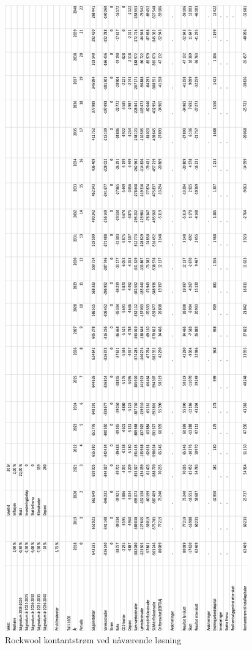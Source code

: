 \begin{figure}[H]
\centering
\includegraphics [scale=0.9]{appendiks/bilder/NNVnow.png}
\caption{Rockwool kontantstrøm ved nåværende løsning}
\label{fig:NNVnow}
\end{figure}

